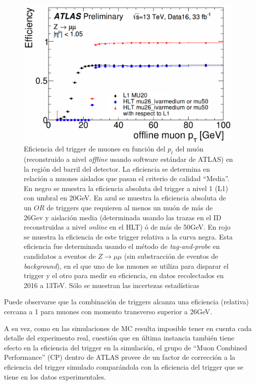\begin{figure}[ht]
    \centering
    \includegraphics[width =0.7\linewidth]{images/TriggEff1}
    \caption{Eficiencia del trigger de muones en función del $p_t$ del muón (reconstruido a nivel \textit{offline} usando software estándar de ATLAS) en la región del barril del detector. La eficiencia se determina en relación a muones aislados que pasan el criterio de calidad ``Media''. En negro se muestra la eficiencia absoluta del trigger a nivel 1 (L1) con umbral en 20GeV. En azul se muestra la eficiencia absoluta de un $OR$ de triggers que requieren al menos un muón de más de 26Gev y aislación media (determinada usando las trazas en el ID reconstruidas a nivel \textit{online} en el HLT) ó de más de 50GeV. En rojo se muestra la eficiencia de este trigger relativa a la curva negra. Esta eficiencia fue determinada usando el método de \textit{tag-and-probe} en candidatos a eventos de $Z\rightarrow \mu\mu$ (sin substracción de eventos de \textit{background}), en el que uno de los muones se utiliza para disparar el trigger y el otro para medir su eficiencia, en datos recolectados en 2016 a 13TeV. Sólo se muestran las incertezas estadísticas\cite{TrigEff} 
    }
    \label{fig:trigEff}
\end{figure}


Puede observarse que la combinación de triggers alcanza una eficiencia (relativa) cercana a 1 para muones con momento transverso superior a 26GeV.

A su vez, como en las simulaciones de MC resulta imposible tener en cuenta cada detalle del experimento real, cuestión que en última instancia también tiene efecto en la eficiencia del trigger en la simulación, el grupo de ``Muon Combined Performance'' (CP) dentro de ATLAS provee de un factor de corrección a la eficiencia del trigger simulado comparándola con la eficiencia del trigger que se tiene en los datos experimentales\cite{MCPGuidelines}. 

